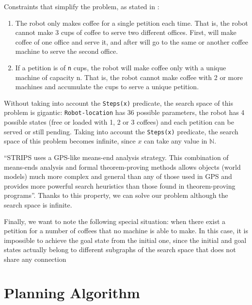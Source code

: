 \documentclass[12pt,a4paper,oneside]{article}
\numberwithin{equation}{section}
\numberwithin{equation}{section}
\theoremstyle{definition}
\begin{document}
Constraints that simplify the problem, as stated in \cite{problemdefinition}:
\begin{enumerate}
	\item The robot only makes coffee for a single petition each time. That is, the robot cannot make 3 cups of coffee to serve two different offices. First, will make coffee of one office and serve it, and after will go to the same or another coffee machine to serve the second office.
	\item If a petition is of \texttt{n} cups, the robot will make coffee only with a unique machine of capacity n. That is, the robot cannot make coffee with 2 or more machines and accumulate the cups to serve a unique petition.
\end{enumerate}


Without taking into account the \texttt{Steps(x)} predicate, the search space of this problem is gigantic: \texttt{Robot-location} has 36 possible parameters, the robot has 4 possible states (free or loaded with 1, 2 or 3 coffees) and each petition can be served or still pending. Taking into account the \texttt{Steps(x)} predicate, the search space of this problem becomes infinite, since $x$ can take any value in $\mathbb{N}$.


“STRIPS uses a GPS-like means-end analysis strategy\cite{gps}. This combination of means-ends analysis and formal theorem-proving methods allows objects (world models) much more complex and general than any of those used in GPS and provides more powerful search heuristics than those found in theorem-proving programs”\cite{strips}. Thanks to this property, we can solve our problem although the search space is infinite.

Finally, we want to note the following special situation: when there exist a petition for a number of coffees that no machine is able to make. In this case, it is impossible to achieve the goal state from the initial one, since the initial and goal states actually belong to different subgraphs of the search space that does not share any connection 


\newpage

\section{Planning Algorithm} \label{Planning Algorithm}
\end{document}
